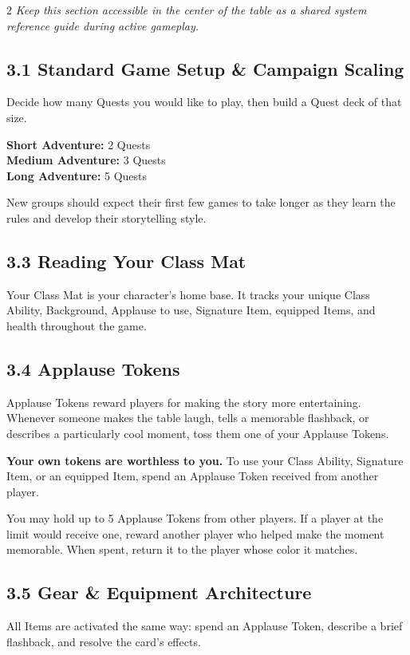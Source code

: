 \begin{multicols}{2}
\textit{Keep this section accessible in the center of the table as a shared system reference guide during active gameplay.}

\subsection*{3.1 Standard Game Setup \& Campaign Scaling}
Decide how many Quests you would like to play, then build a Quest deck of that size.

\textbf{Short Adventure:} 2 Quests\\
\textbf{Medium Adventure:} 3 Quests\\
\textbf{Long Adventure:} 5 Quests

New groups should expect their first few games to take longer as they learn the rules and develop their storytelling style.

\subsection*{3.3 Reading Your Class Mat}
Your Class Mat is your character's home base. It tracks your unique Class Ability, Background, Applause to use, Signature Item, equipped Items, and health throughout the game.
\DndrGraphicPlaceholder{2.45in}

\subsection*{3.4 Applause Tokens}
Applause Tokens reward players for making the story more entertaining. Whenever someone makes the table laugh, tells a memorable flashback, or describes a particularly cool moment, toss them one of your Applause Tokens.

\textbf{Your own tokens are worthless to you.} To use your Class Ability, Signature Item, or an equipped Item, spend an Applause Token received from another player.

You may hold up to 5 Applause Tokens from other players. If a player at the limit would receive one, reward another player who helped make the moment memorable. When spent, return it to the player whose color it matches.

\subsection*{3.5 Gear \& Equipment Architecture}
All Items are activated the same way: spend an Applause Token, describe a brief flashback, and resolve the card's effects.


\end{multicols}

